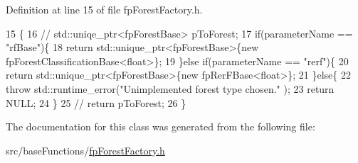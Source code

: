 Definition at line 15 of file fp\+Forest\+Factory.\+h.


\begin{DoxyCode}
15                                                                                             \{
16             \textcolor{comment}{//  std::uniqe\_ptr<fpForestBase> pToForest;}
17                 \textcolor{keywordflow}{if}(parameterName == \textcolor{stringliteral}{"rfBase"})\{
18                     \textcolor{keywordflow}{return} std::unique\_ptr<fpForestBase>\{\textcolor{keyword}{new} fpForestClassificationBase<float>\};
19                 \}\textcolor{keywordflow}{else} \textcolor{keywordflow}{if}(parameterName == \textcolor{stringliteral}{"rerf"})\{
20                     \textcolor{keywordflow}{return} std::unique\_ptr<fpForestBase>\{\textcolor{keyword}{new} fpRerFBase<float>\};
21                 \}\textcolor{keywordflow}{else}\{
22                     \textcolor{keywordflow}{throw} std::runtime\_error(\textcolor{stringliteral}{"Unimplemented forest type chosen."} );
23                     \textcolor{keywordflow}{return} NULL;
24                 \}
25         \textcolor{comment}{//      return pToForest;}
26             \}
\end{DoxyCode}


The documentation for this class was generated from the following file\+:\begin{DoxyCompactItemize}
\item 
src/base\+Functions/\hyperlink{fpForestFactory_8h}{fp\+Forest\+Factory.\+h}\end{DoxyCompactItemize}
